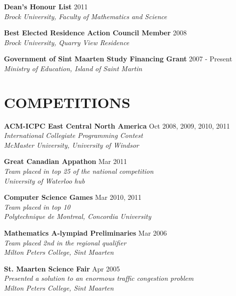 \documentclass[margin]{res}
\begin{document}
\begin{resume}
  \textbf{Dean's Honour List} \hfill 2011 \\
    {\sl Brock University, Faculty of Mathematics and Science}

  \textbf{Best Elected Residence Action Council Member} \hfill 2008 \\
    {\sl Brock University, Quarry View Residence}

  \textbf{Government of Sint Maarten Study Financing Grant} \hfill 2007 - Present \\
    {\sl Ministry of Education, Island of Saint Martin}
 
\section{COMPETITIONS}

  \textbf{ACM-ICPC East Central North America} \hfill Oct 2008, 2009, 2010, 2011 \\
    {\sl International Collegiate Programming Contest} \\
    {\sl McMaster University, University of Windsor} %

  \textbf{Great Canadian Appathon} \hfill Mar 2011 \\
    {\sl Team placed in top 25 of the national competition} \\
    {\sl University of Waterloo hub}

  \textbf{Computer Science Games} \hfill Mar 2010, 2011 \\
    {\sl Team placed in top 10} \\
    {\sl Polytechnique de Montreal, Concordia University}


  \textbf{Mathematics A-lympiad Preliminaries} \hfill Mar 2006 \\
    {\sl Team placed 2nd in the regional qualifier} \\
    {\sl Milton Peters College, Sint Maarten}

  \textbf{St. Maarten Science Fair} \hfill Apr 2005 \\
    {\sl Presented a solution to an enormous traffic congestion problem} \\
    {\sl Milton Peters College, Sint Maarten}


\end{resume}
\end{document}
